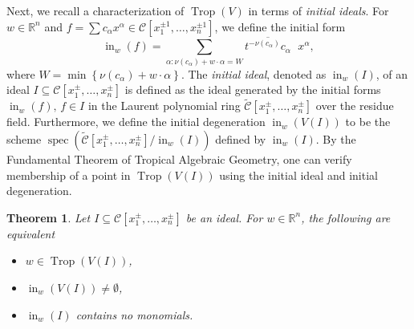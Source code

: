\documentclass{article}
\newtheorem{theorem}{Theorem}[section]
\theoremstyle{definition}
\DeclareMathOperator{\Trop}{Trop}
\newcommand{\CC}{\mathcal{C}}
\newcommand{\inw}{\operatorname{in}_w}
\begin{document}
Next, we recall a characterization of $\Trop(V)$ in terms of \emph{initial ideals}. For $w \in \mathbb{R}^n$ and $f = \sum c_\alpha x^\alpha \in \mathcal{C}[x_1^{ \pm 1}, \ldots, x_n^{ \pm 1}]$, we define the initial form 
\[\inw(f)=\sum_{\alpha \colon \nu\left(c_{\alpha}\right)+ w \cdot \alpha =W} \overline{t^{-\nu\left(c_{\alpha}\right)} c_{\alpha}} \phantom{\cdot} x^{\alpha},  \]
where $W=\min \left\{\nu\left(c_\alpha\right)+w \cdot \alpha \right\}$. The \emph{initial ideal}, denoted as $\inw(I)$, of an ideal $I \subseteq \mathcal{C}[x_1^\pm, \dots , x_n^\pm]$ is defined as the ideal generated by the initial forms $\inw(f), \, f \in I$ in the Laurent polynomial ring $\widetilde{\CC}[x_1^\pm, \dots , x_n^\pm]$ over the residue field.
Furthermore, we define the initial degeneration $\inw(V(I))$ to be the scheme $\operatorname{spec}\left(\widetilde{\CC}[x_1^\pm, \dots , x_n^\pm] / \inw(I)\right)$ defined by $\inw(I)$.
By the Fundamental Theorem of Tropical Algebraic Geometry, one can verify membership of a point in $\Trop(V(I))$ using the initial ideal and initial degeneration.

\begin{theorem}\cite[Fundamental Theorem of Tropical Algebraic Geometry, Theorem 3.2.3]{maclagan2015introduction}
\label{Thm:FundamentalThm}
    Let $I \subseteq \mathcal{C}[x_1^{\pm}, \dots , x_n^{\pm}]$ be an ideal. For $w \in \mathbb{R}^n$, the following are equivalent
\begin{itemize}
    \item[(i)] $w \in \Trop(V(I))$,
    \item[(ii)] $\inw(V(I)) \neq \emptyset$, 
    \item[(iii)] $\inw(I)$ contains no monomials.
\end{itemize}
\end{theorem}
\end{document}
